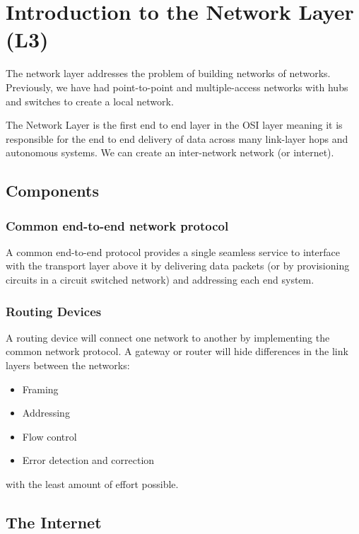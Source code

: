 \section{Introduction to the Network Layer (L3)}\label{sec:introduction_to_the_network_layer}

The network layer addresses the problem of building networks of networks.
Previously, we have had point-to-point and multiple-access networks with hubs and switches to create a local network.

The Network Layer is the first end to end layer in the OSI layer meaning it is responsible for the end to end delivery of data across many link-layer hops and autonomous systems.
We can create an inter-network network (or internet).

\subsection{Components}\label{sub:components_}

\subsubsection{Common end-to-end network protocol}\label{ssub:common_end_to_end_network_protocol}

A common end-to-end protocol provides a single seamless service to interface with the transport layer above it by delivering data packets (or by provisioning circuits in a circuit switched network) and addressing each end system.

\subsubsection{Routing Devices}\label{ssub:routing_devices}

A routing device will connect one network to another by implementing the common network protocol.
A gateway or router will hide differences in the link layers between the networks:
\begin{itemize}
    \item Framing
    \item Addressing
    \item Flow control
    \item Error detection and correction
\end{itemize}
with the least amount of effort possible.

\subsection{The Internet}\label{sub:the_internet}

